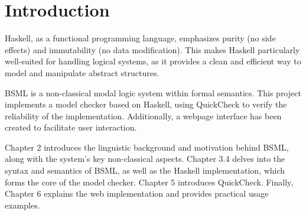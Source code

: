 
\section{Introduction}\label{sec:Introduction}

Haskell, as a functional programming language, 
emphasizes purity (no side effects) and immutability (no data modification). 
This makes Haskell particularly well-suited for handling logical systems, 
as it provides a clean and efficient way to model and manipulate abstract structures. 

BSML is a non-classical modal logic system within formal semantics. This project implements a model checker based on Haskell, 
using QuickCheck to verify the reliability of the implementation. 
Additionally, a webpage interface has been created to facilitate user interaction. 

Chapter 2 introduces the linguistic background and motivation behind BSML, along with the system's key non-classical aspects. 
Chapter 3.4 delves into the syntax and semantics of BSML, as well as the Haskell implementation, which forms the core of the model checker. 
Chapter 5 introduces QuickCheck. 
Finally, Chapter 6 explains the web implementation and provides practical usage examples.